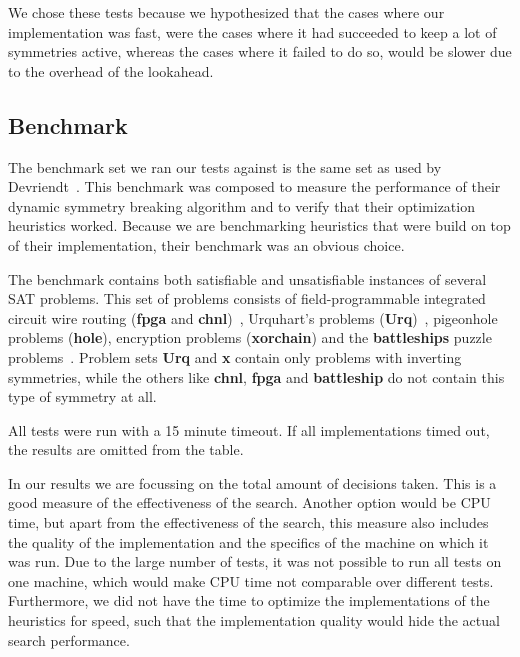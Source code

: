 	We chose these tests because we hypothesized that the cases where our implementation was fast,
	were the cases where it had succeeded to keep a lot of symmetries active,
	whereas the cases where it failed to do so, would be slower due to the overhead of the lookahead.

\subsection{Benchmark}
\label{ssec:benchmark}
	The benchmark set we ran our tests against is the same set as used by Devriendt~\cite{devriendt2012symmetry}.
	This benchmark was composed to measure the performance of their dynamic symmetry
	breaking algorithm and to verify that their optimization heuristics worked.
	Because we are benchmarking heuristics that were build on top of their implementation, their
	benchmark was an obvious choice.

	The benchmark contains both satisfiable and unsatisfiable instances of several SAT problems.
	This set of problems consists of field-programmable integrated circuit wire routing (\textbf{fpga} and
	\textbf{chnl})~\cite{nam2004comparative}, Urquhart's problems (\textbf{Urq})~\cite{urquhart1987hard},
	pigeonhole problems (\textbf{hole}), encryption problems (\textbf{xorchain}) and the \textbf{battleships}
	puzzle problems~\cite{sevenster2004battleships}.
	Problem sets \textbf{Urq} and \textbf{x} contain only problems with inverting symmetries, while the
	others like \textbf{chnl}, \textbf{fpga} and \textbf{battleship} do not contain this type of symmetry
	at all\cite{devriendt2012symmetry}.

	All tests were run with a 15 minute timeout.
	If all implementations timed out, the results are omitted from the table.

	In our results we are focussing on the total amount of decisions taken.
	This is a good measure of the effectiveness of the search.
	Another option would be CPU time, but apart from the effectiveness of the search, this measure
	also includes the quality of the implementation and the specifics of the machine on which it was
	run.
	Due to the large number of tests, it was not possible to run all tests on one machine, which
	would make CPU time not comparable over different tests.
	Furthermore, we did not have the time to optimize the implementations of the heuristics for
	speed, such that the implementation quality would hide the actual search performance.

